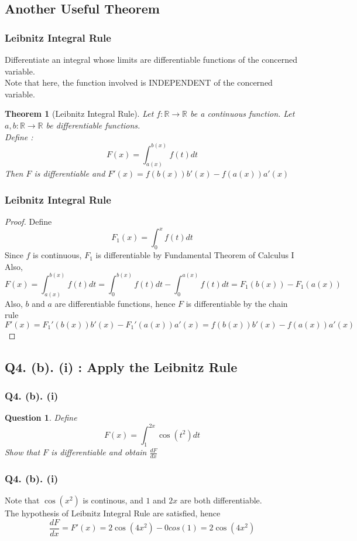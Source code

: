 \documentclass[aspectratio=169]{beamer}
\newtheorem{thm}{Theorem}
\newtheorem{qsn}{Question}
\newcommand{\bR}{\mathbb{R}}
\begin{document}
\subsection{Another Useful Theorem}

\begin{frame}
\frametitle{Leibnitz Integral Rule}
\pause
Differentiate an integral whose limits are differentiable functions of the concerned variable.\\[1mm]\pause
Note that here, the function involved is INDEPENDENT of the concerned variable.\pause
\begin{thm}[Leibnitz Integral Rule]
Let $f:\bR\to\bR$ be a continuous function. Let $a,b : \bR\to\bR$ be differentiable functions.\\
Define :
$$F(x) = \int_{a(x)}^{b(x)} f(t)dt$$
Then $F$ is differentiable and $F'(x) = f(b(x))b'(x) - f(a(x))a'(x)$
\end{thm}
\end{frame}

\begin{frame}
\frametitle{Leibnitz Integral Rule}
\begin{proof}
\pause
Define $$F_1(x) = \int_0^x f(t)dt$$\pause
Since $f$ is continuous, $F_1$ is differentiable by Fundamental Theorem of Calculus I \\ \pause
Also, $$F(x) = \int_{a(x)}^{b(x)} f(t)dt = \int_0^{b(x)} f(t)dt - \int_0^{a(x)} f(t) dt = F_1(b(x)) - F_1(a(x))$$ \pause
Also, $b$ and $a$ are differentiable functions, hence $F$ is differentiable by the chain rule \pause
$$F'(x) = F_1'(b(x))b'(x) - F_1'(a(x))a'(x) = f(b(x))b'(x) - f(a(x))a'(x)$$
\end{proof}
\end{frame}

\subsection{Q4. (b). (i) : Apply the Leibnitz Rule}

\begin{frame}
\frametitle{Q4. (b). (i)}
\pause
\begin{qsn}
Define
$$F(x) = \int_{1}^{2x} \cos(t^2) dt$$
Show that $F$ is differentiable and obtain $\displaystyle{\frac{dF}{dx}}$
\end{qsn}
\end{frame}

\begin{frame}
\frametitle{Q4. (b). (i)}
\pause
Note that $\cos(x^2)$ is continous, and $1$ and $2x$ are both differentiable.\\[1mm]\pause
The hypothesis of Leibnitz Integral Rule are satisfied, hence 
$$\frac{dF}{dx} = F'(x) = 2\cos(4x^2) - 0cos(1) = 2\cos(4x^2)$$
\end{frame}
\end{document}
